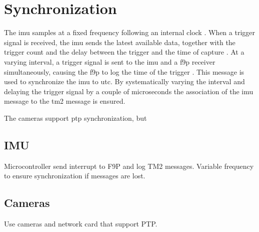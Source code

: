 \section*{Synchronization}
The \gls{imu} samples at a fixed frequency following an internal clock \cite{safranSTIM300Datasheet}.
When a trigger signal is received, the \gls{imu} sends the latest available data, together with the trigger count and the delay between the trigger and the time of capture \cite{safranSTIM300Datasheet}.
At a varying interval, a trigger signal is sent to the \gls{imu} and a \gls{f9p} receiver simultaneously, causing the \gls{f9p} to log the time of the trigger \cite[190]{u-bloxZEDF9PInterfaceDescription}.
This message is used to synchronize the \gls{imu} to \gls{utc}.
By systematically varying the interval and delaying the trigger signal by a couple of microseconds the association of the \gls{imu} message to the \gls{tm2} message is ensured.

The cameras support \gls{ptp} synchronization, but


\subsection*{IMU}
Microcontroller send interrupt to F9P and log TM2 messages.
Variable frequency to ensure synchronization if messages are lost.

\subsection*{Cameras}
Use cameras and network card that support PTP.
